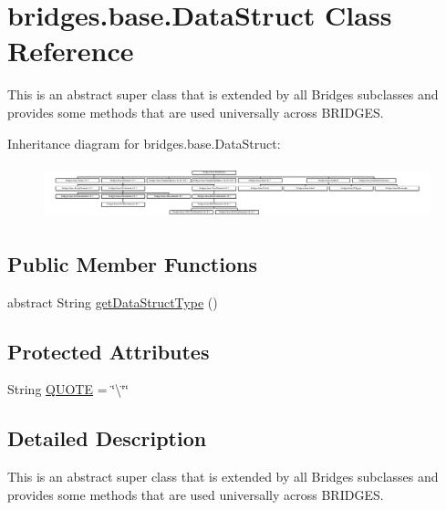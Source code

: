 \hypertarget{classbridges_1_1base_1_1_data_struct}{}\section{bridges.\+base.\+Data\+Struct Class Reference}
\label{classbridges_1_1base_1_1_data_struct}


This is an abstract super class that is extended by all Bridges subclasses and provides some methods that are used universally across B\+R\+I\+D\+G\+ES.  


Inheritance diagram for bridges.\+base.\+Data\+Struct\+:\begin{figure}[H]
\begin{center}
\leavevmode
\includegraphics[height=1.578947cm]{classbridges_1_1base_1_1_data_struct}
\end{center}
\end{figure}
\subsection*{Public Member Functions}
\begin{DoxyCompactItemize}
\item 
abstract String \mbox{\hyperlink{classbridges_1_1base_1_1_data_struct_a3bae9d0d68a85e517a34be482e90fdd4}{get\+Data\+Struct\+Type}} ()
\end{DoxyCompactItemize}
\subsection*{Protected Attributes}
\begin{DoxyCompactItemize}
\item 
String \mbox{\hyperlink{classbridges_1_1base_1_1_data_struct_aac4a6ea28f44676274120ba1dddafc1f}{Q\+U\+O\+TE}} = \char`\"{}\textbackslash{}\char`\"{}\char`\"{}
\end{DoxyCompactItemize}


\subsection{Detailed Description}
This is an abstract super class that is extended by all Bridges subclasses and provides some methods that are used universally across B\+R\+I\+D\+G\+ES. 

